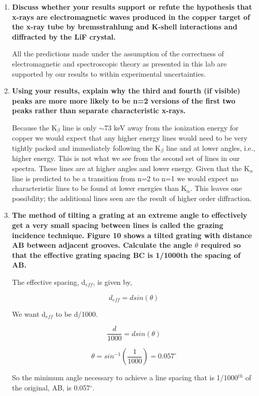 \begin{enumerate}[resume]
\item {\bf Discuss whether your results support or refute the hypothesis that x-rays are electromagnetic waves produced in the copper target of the x-ray tube by bremsstrahlung and K-shell interactions and diffracted by the LiF crystal.}\newline

All the predictions made under the assumption of the correctness of electromagnetic and spectroscopic theory as presented in this lab are supported by our results to within experimental uncertainties.

\item {\bf Using your results, explain why the third and fourth (if visible) peaks are more more likely to be n=2 versions of the first two peaks rather than separate characteristic x-rays.}\newline

Because the K$_{\beta}$ line is only $\sim$73 keV away from the ionization energy for copper we would expect that any higher energy lines would need to be very tightly packed and immediately following the K$_{\beta}$ line and at lower angles, i.e., higher energy. This is not what we see from the second set of lines in our spectra. These lines are at higher angles and lower energy. Given that the K$_{\alpha}$ line is predicted to be a transition from n=2 to n=1 we would expect no characteristic lines to be found at lower energies than K$_{\alpha}$. This leaves one possibility; the additional lines seen are the result of higher order diffraction.

\item {\bf The method of tilting a grating at an extreme angle to effectively get a very small spacing between lines is called the {\bf grazing incidence technique}. Figure 10 shows a tilted grating with distance AB between adjacent grooves. Calculate the angle $\theta$ required so that the effective grating spacing BC is 1/1000th the spacing of AB.}\newline

The effective spacing, d$_{eff}$, is given by,

\begin{equation}
d_{eff}=dsin(\theta)
\label{equ:twcg5}
\end{equation}

\noindent We want d$_{eff}$ to be d/1000.

\begin{equation}
\dfrac{d}{1000}=dsin(\theta)
\label{equ:twcg6}
\end{equation}

\begin{equation}
\theta=sin^{-1}\left(\dfrac{1}{1000}\right)=0.057^{\circ}
\label{equ:twcg7}
\end{equation}

So the minimum angle necessary to achieve a line spacing that is 1/1000$^{th}$ of the original, AB, is 0.057$^{\circ}$.

\end{enumerate}
\newpage

